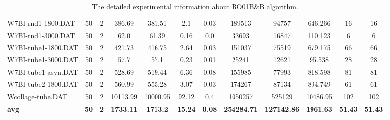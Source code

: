 \begin{table}[!h]
{\begin{tabular}{lccccccccccc}
W7BI-rnd1-1800.DAT & 50 & 2 & 386.69 & 381.51 & 2.1 & 0.03 & 189513 & 94757 & 646.266 & 16 & 16\\
W7BI-rnd1-3000.DAT & 50 & 2 & 62.0 & 61.39 & 0.16 & 0.0 & 33693 & 16847 & 110.123 & 6 & 6\\
W7BI-tube1-1800.DAT & 50 & 2 & 421.73 & 416.75 & 2.64 & 0.03 & 151037 & 75519 & 679.175 & 66 & 66\\
W7BI-tube1-3000.DAT & 50 & 2 & 57.7 & 57.1 & 0.23 & 0.01 & 25241 & 12621 & 95.538 & 28 & 28\\
W7BI-tube1-asyn.DAT & 50 & 2 & 528.69 & 519.44 & 6.36 & 0.08 & 155985 & 77993 & 818.598 & 81 & 81\\
W7BI-tube2-1800.DAT & 50 & 2 & 560.99 & 555.28 & 3.07 & 0.03 & 174267 & 87134 & 894.749 & 61 & 61\\
Wcollage-tube.DAT & 50 & 2 & 10113.99 & 10000.95 & 92.12 & 0.4 & 1050257 & 525129 & 10486.95 & 102 & 102\\
\cline{1-12} \textbf{avg} & \textbf{50} & \textbf{2} & \textbf{1733.11} & \textbf{1713.2} & \textbf{15.24} & \textbf{0.08} & \textbf{254284.71} & \textbf{127142.86} & \textbf{1961.63} & \textbf{51.43} & \textbf{51.43} \\ \cline{1-12}
\bottomrule
\end{tabular}%
}%
\caption{The detailed experimental information about BO01B\&B algorithm.}
\label{tab:table_bb}
\end{table}

